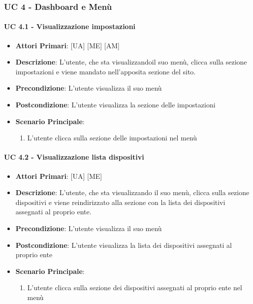 			\subsubsection{UC 4 - Dashboard e Menù}
				\paragraph{UC 4.1 - Visualizzazione impostazioni}
			\begin{itemize}
				\item \textbf{Attori Primari}: [UA] [ME] [AM]
				\item \textbf{Descrizione}: L'utente, che sta visualizzandoil suo menù, clicca sulla sezione impostazioni e viene mandato nell'apposita sezione del sito.
				\item \textbf{Precondizione}: L'utente visualizza il suo menù
				\item \textbf{Postcondizione}: L'utente visualizza la sezione delle impostazioni
				\item \textbf{Scenario Principale}:
				\begin{enumerate}
					\item{L'utente clicca sulla sezione delle impostazioni nel menù}
					
				\end{enumerate}	
			\end{itemize}
			
			\paragraph{UC 4.2 - Visualizzazione lista dispositivi}
			\begin{itemize}
				\item \textbf{Attori Primari}: [UA] [ME]
				\item \textbf{Descrizione}: L'utente, che sta visualizzando il suo menù, clicca sulla sezione dispositivi e viene reindirizzato alla sezione con la lista dei dispositivi assegnati al proprio ente.
				\item \textbf{Precondizione}: L'utente visualizza il suo menù
				\item \textbf{Postcondizione}: L'utente visualizza la lista dei dispositivi assegnati al proprio ente
				\item \textbf{Scenario Principale}:
				\begin{enumerate}
					\item{L'utente clicca sulla sezione dei dispositivi assegnati al proprio ente nel menù}
				\end{enumerate}	
			\end{itemize}

